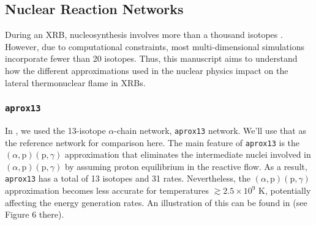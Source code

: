 \documentclass[preprint,times,tighten]{aastex631}
\begin{document}


        
        


\subsection{Nuclear Reaction Networks}\label{Sec:network}

During an XRB, nucleosynthesis involves more than a thousand isotopes \citep{Woosley_2004,Koike_2004}. However, due to computational constraints, most multi-dimensional simulations incorporate fewer than 20 isotopes. Thus, this manuscript aims to understand how the different approximations used in the nuclear physics impact on the lateral thermonuclear flame in XRBs.

\subsubsection{\tt aprox13}

In \citet{eiden:2020,harpole:2021}, we used the 13-isotope $\alpha$-chain network, {\tt aprox13} \citep{timmes_aprox13} network.  We'll
use that as the reference network for comparison here.  
The main feature of {\tt aprox13} is the $(\alpha, \mbox{p})(\mbox{p}, \gamma)$ approximation that eliminates the intermediate nuclei involved in $(\alpha, \mbox{p})(\mbox{p}, \gamma)$ by
assuming proton equilibrium in the reactive flow.
As a result, {\tt aprox13} has a total of 13 isotopes and 31 rates. Nevertheless, the $(\alpha, \mbox{p})(\mbox{p}, \gamma)$ approximation becomes less accurate for temperatures $\gtrsim 2.5 \times 10^9$ K, potentially affecting the energy generation rates.  An illustration of this can be found in \cite{pynucastro2} (see Figure 6 there).
\end{document}
